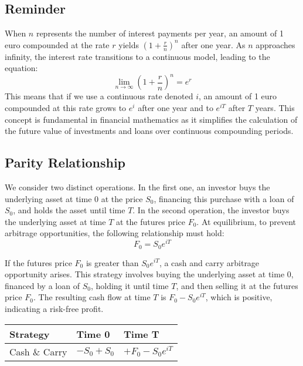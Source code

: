 \documentclass[a4paper,10pt]{article}
\begin{document}
    \subsection*{Reminder}

        \noindent When \( n \) represents the number of interest payments per year, an amount of 1 euro compounded at the rate \( r \) yields \( (1 + \frac{r}{n})^n \) after one year. As \( n \) approaches infinity, the interest rate transitions to a continuous model, leading to the equation:
        \[ \lim_{n \to \infty} (1 + \frac{r}{n})^n = e^r \]
        This means that if we use a continuous rate denoted \( i \), an amount of 1 euro compounded at this rate grows to \( e^i \) after one year and to \( e^{iT} \) after \( T \) years. This concept is fundamental in financial mathematics as it simplifies the calculation of the future value of investments and loans over continuous compounding periods. \\
        
    \subsection*{Parity Relationship}

        \noindent We consider two distinct operations. In the first one, an investor buys the underlying asset at time 0 at the price \( S_0 \), financing this purchase with a loan of \( S_0 \), and holds the asset until time \( T \). In the second operation, the investor buys the underlying asset at time \( T \) at the futures price \( F_0 \). At equilibrium, to prevent arbitrage opportunities, the following relationship must hold:
        \[ F_0 = S_0 e^{iT} \]
        
        \noindent If the futures price \( F_0 \) is greater than \( S_0 e^{iT} \), a cash and carry arbitrage opportunity arises. This strategy involves buying the underlying asset at time 0, financed by a loan of \( S_0 \), holding it until time \( T \), and then selling it at the futures price \( F_0 \). The resulting cash flow at time \( T \) is \( F_0 - S_0 e^{iT} \), which is positive, indicating a risk-free profit. \\
        
        \noindent\begin{tabularx}{\textwidth}{|Y|Y|Y|}
            \hline
            \textbf{Strategy} & \textbf{Time 0} & \textbf{Time T} \\ \hline
            Cash \& Carry & \( -S_0 +S_0 \) & \( + F_0 -S_0 e^{iT} \) \\ \hline
        \end{tabularx}\\\\
        
\end{document}
